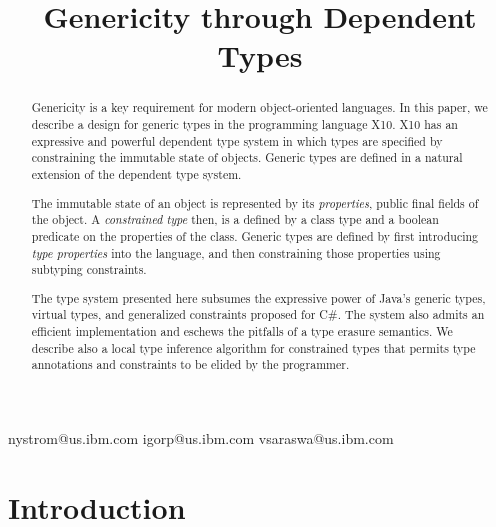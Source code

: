 \documentclass[preprint,nocopyrightspace,9pt]{sigplanconf}
\newif\iflncs
\begin{document}
\title{Genericity through Dependent Types}

\iflncs

\author{
Nathaniel Nystom\inst{1}
\and
Igor Peshansky\inst{1}
\and
Vijay Saraswat\inst{1}
}

\institute{IBM T.~J. Watson Research~Center, P.O.~Box~704, Yorktown~Heights NY 10598 USA,
\email{\{nystrom,vsaraswa\}@us.ibm.com}}

\else

  {nystrom@us.ibm.com}
  {igorp@us.ibm.com}
  {vsaraswa@us.ibm.com}


\fi

\maketitle

\begin{abstract}
Genericity is a key requirement for modern object-oriented languages.
In this paper, we describe a design for generic types in
the programming language X10.
X10 has an expressive and powerful dependent type system
in which types are specified by constraining the immutable state
of objects.  Generic types are defined
in a natural extension of the
dependent type system.

The immutable state of an object is represented by its
\emph{properties}, public final fields of the object.
A \emph{constrained type} then, is a defined by a class type and
a boolean predicate on the properties of the class.
Generic types are defined by first introducing \emph{type properties} into
the language, and then constraining those properties using
subtyping constraints.

The type system presented  here  subsumes the expressive power
of Java's generic types, virtual types,
and generalized constraints proposed for C\#.
The system also admits an efficient implementation
and eschews the pitfalls of a type erasure semantics.
We describe also a local type inference algorithm for constrained
types that permits type annotations and constraints to be elided
by the programmer.
\end{abstract}

\section{Introduction}
\end{document}
